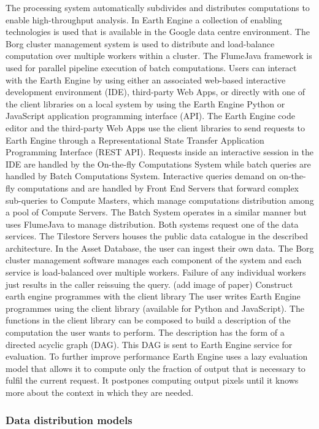 \documentclass[11pt,twoside,a4paper,final]{report}
\begin{document}
The processing system automatically subdivides and distributes computations to enable high-throughput analysis. In Earth Engine a collection of enabling technologies is used that is available in the Google data centre environment. The Borg cluster management system is used to distribute and load-balance computation over multiple workers within a cluster. The FlumeJava framework is used for parallel pipeline execution of batch computations.
Users can interact with the Earth Engine by using either an associated web-based interactive development environment (IDE), third-party Web Apps, or directly with one of the client libraries on a local system by using the Earth Engine Python or JavaScript application programming interface (API).
The Earth Engine code editor and the third-party Web Apps use the client libraries to send requests to Earth Engine through a Representational State Transfer Application Programming Interface (REST API). Requests inside an interactive session in the IDE are handled by the On-the-fly Computations System while batch queries are handled by Batch Computations System. Interactive queries demand on on-the-fly computations and are handled by Front End Servers that forward complex sub-queries to Compute Masters, which manage computations distribution among a pool of Compute Servers. The Batch System operates in a similar manner but uses FlumeJava to manage distribution. Both systems request one of the data services. The Tilestore Servers houses the public data catalogue in the described architecture. In the Asset Database, the user can ingest their own data. 
The Borg cluster management software manages each component of the system and each service is load-balanced over multiple workers. Failure of any individual workers just results in the caller reissuing the query.
(add image of paper)
Construct earth engine programmes with the client library
The user writes Earth Engine programmes using the client library (available for Python and JavaScript).
The functions in the client library can be composed to build a description of the computation the user wants to perform. The description has the form of a directed acyclic graph (DAG). This DAG is sent to Earth Engine service for evaluation. To further improve performance Earth Engine uses a lazy evaluation model that allows it to compute only the fraction of output that is necessary to fulfil the current request. It postpones computing output pixels until it knows more about the context in which they are needed.


\subsubsection{Data distribution models}
\end{document}
